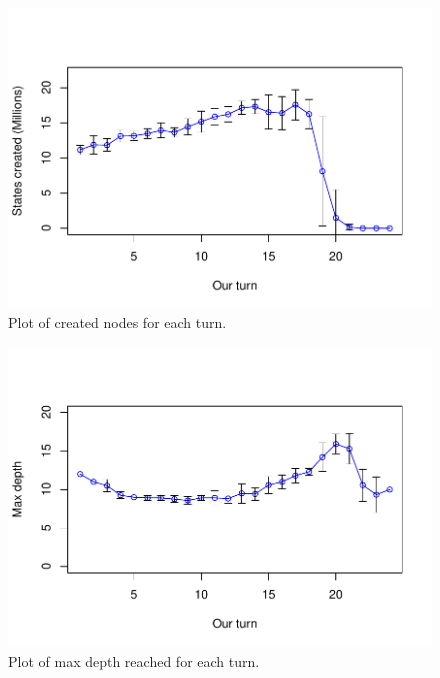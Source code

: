 \documentclass[12pt]{article}
\begin{document}
\begin{figure}
  \centering
  \includegraphics[scale=0.5]{../results/created_plot.pdf}
  \caption{Plot of created nodes for each turn.}
  \label{fig:create}
\end{figure}

\begin{figure}
  \centering
  \includegraphics[scale=0.5]{../results/depth_plot.pdf}
  \caption{Plot of max depth reached for each turn.}
  \label{fig:depth}
\end{figure}
\end{document}
